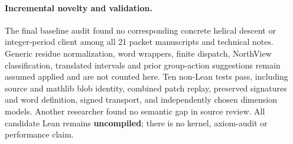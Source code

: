 \paragraph{Incremental novelty and validation.}
The final baseline audit found no corresponding concrete helical descent
or integer-period client among all 21 packet manuscripts and technical
notes.  Generic residue normalization, word wrappers, finite dispatch,
NorthView classification, translated intervals and prior group-action
suggestions remain assumed applied and are not counted here.  Ten
non-Lean tests pass, including source and mathlib blob identity, combined
patch replay, preserved signatures and word definition, signed transport,
and independently chosen dimension models.  Another researcher found no
semantic gap in source review.  All candidate Lean remains
\textbf{uncompiled}; there is no kernel, axiom-audit or performance claim.
